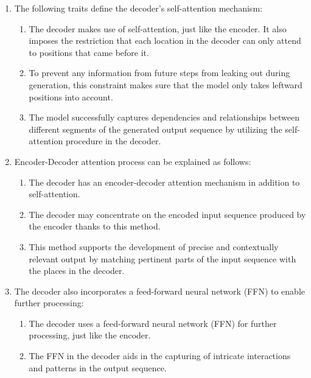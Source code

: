 \begin{enumerate}
   \item The following traits define the decoder's self-attention mechanism:

    \begin{enumerate}
       \item The decoder makes use of self-attention, just like the encoder. It also imposes the restriction that each location in the decoder can only attend to positions that came before it.



      \item To prevent any information from future steps from leaking out during generation, this constraint makes sure that the model only takes leftward positions into account.


        \item The model successfully captures dependencies and relationships between different segments of the generated output sequence by utilizing the self-attention procedure in the decoder.

    \end{enumerate}
    
    \item Encoder-Decoder attention process can be explained as follows:

    \begin{enumerate}
        \item The decoder has an encoder-decoder attention mechanism in addition to self-attention.


       \item The decoder may concentrate on the encoded input sequence produced by the encoder thanks to this method.


      \item This method supports the development of precise and contextually relevant output by matching pertinent parts of the input sequence with the places in the decoder.

    \end{enumerate}

   \item The decoder also incorporates a feed-forward neural network (FFN) to enable further processing:

    \begin{enumerate}
       \item The decoder uses a feed-forward neural network (FFN) for further processing, just like the encoder.
        \item The FFN in the decoder aids in the capturing of intricate interactions and patterns in the output sequence.


\end{enumerate}
\end{enumerate}
